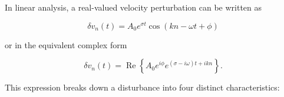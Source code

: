 \documentclass[11pt,a4paper,openany]{book}
\numberwithin{equation}{chapter}
\numberwithin{figure}{chapter}
\numberwithin{table}{chapter}
\begin{document}
In linear analysis, a real-valued velocity perturbation can be written as

\begin{equation}
\boxed{
\delta v_n(t)
=A_0e^{\sigma t}
\cos\!\left(kn-\omega t+\phi\right)
}
\label{eq:waveform}
\end{equation}

or in the equivalent complex form

\begin{equation}
\delta v_n(t)
=\operatorname{Re}\!\left\{
A_0e^{i\phi}e^{(\sigma-i\omega)t+ikn}
\right\}.
\end{equation}

This expression breaks down a disturbance into four distinct characteristics:
\end{document}
